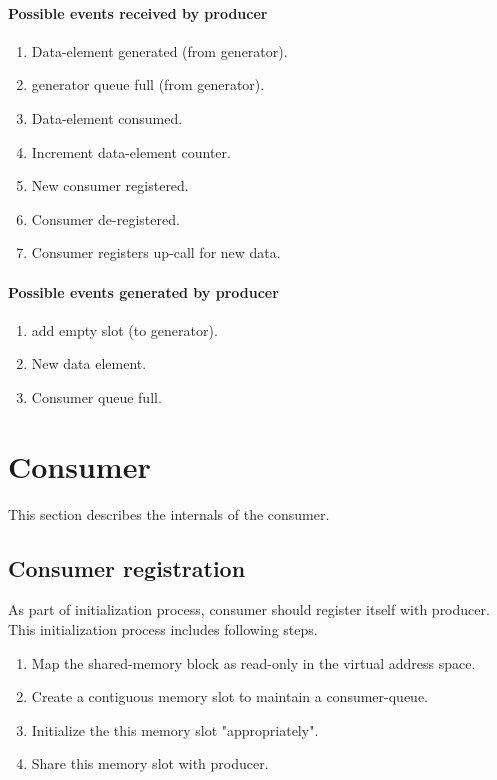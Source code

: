 \documentclass[a4paper,twoside]{report} %
\begin{document}
\paragraph{Possible events received by producer}
\begin{enumerate} 
  \item Data-element generated (from generator).
  \item generator queue full (from generator).
  \item Data-element consumed.
  \item Increment data-element counter.
  \item New consumer registered.
  \item Consumer de-registered.
  \item Consumer registers up-call for new data.
\end{enumerate} 

\paragraph{Possible events generated by producer}
\begin{enumerate} 
  \item add empty slot (to generator). 
  \item New data element.
  \item Consumer queue full. 
\end{enumerate} 

\section{Consumer}
This section describes the internals of the consumer.

\subsection{Consumer registration}
As part of initialization process, consumer should register itself
with producer.  This initialization process includes following steps.
\begin{enumerate} 
  \item Map the shared-memory block as read-only in the virtual
  address space.
  \item Create a contiguous memory slot to maintain a consumer-queue.
  \item Initialize the this memory slot "appropriately".
  \item Share this memory slot with producer.
\end{enumerate} 
\end{document}
